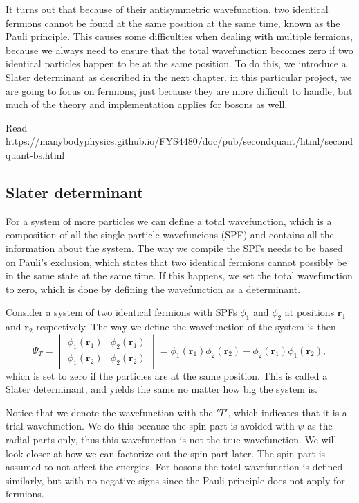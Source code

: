 It turns out that because of their antisymmetric wavefunction, two identical fermions cannot be found at the same position at the same time, known as the Pauli principle. This causes some difficulties when dealing with multiple fermions, because we always need to ensure that the total wavefunction becomes zero if two identical particles happen to be at the same position. To do this, we introduce a Slater determinant as described in the next chapter. in this particular project, we are going to focus on fermions, just because they are more difficult to handle, but much of the theory and implementation applies for bosons as well. 

Read https://manybodyphysics.github.io/FYS4480/doc/pub/secondquant/html/secondquant-bs.html


\subsection{Slater determinant} \label{sec:slater}
For a system of more particles we can define a total wavefunction, which is a composition of all the single particle wavefuncions (SPF) and contains all the information about the system. The way we compile the SPFs needs to be based on Pauli's exclusion, which states that two identical fermions cannot possibly be in the same state at the same time. If this happens, we set the total wavefunction to zero, which is done by defining the wavefunction as a determinant. 

Consider a system of two identical fermions with SPFs $\phi_1$ and $\phi_2$ at positions $\boldsymbol{r}_1$ and $\boldsymbol{r}_2$ respectively. The way we define the wavefunction of the system is then
\begin{equation}
\Psi_T=
\begin{vmatrix}
\phi_1(\boldsymbol{r}_1) & \phi_2(\boldsymbol{r}_1)\\
\phi_1(\boldsymbol{r}_2) & \phi_2(\boldsymbol{r}_2)
\end{vmatrix}
=\phi_1(\boldsymbol{r}_1)\phi_2(\boldsymbol{r}_2)-\phi_2(\boldsymbol{r}_1)\phi_1(\boldsymbol{r}_2),
\end{equation}
which is set to zero if the particles are at the same position. This is called a Slater determinant, and yields the same no matter how big the system is.

Notice that we denote the wavefunction with the $'T'$, which indicates that it is a trial wavefunction. We do this because the spin part is avoided with $\psi$ as the radial parts only, thus this wavefunction is not the true wavefunction. We will look closer at how we can factorize out the spin part later. The spin part is assumed to not affect the energies. For bosons the total wavefunction is defined similarly, but with no negative signs since the Pauli principle does not apply for fermions. 

